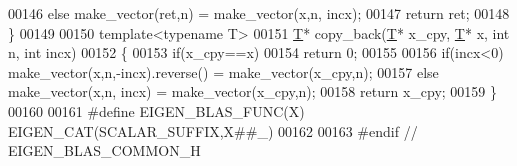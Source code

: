 \begin{DoxyCode}
00146   \textcolor{keywordflow}{else}       make\_vector(ret,n) = make\_vector(x,n, incx);
00147   \textcolor{keywordflow}{return} ret;
00148 \}
00149 
00150 \textcolor{keyword}{template}<\textcolor{keyword}{typename} T>
00151 \hyperlink{group___sparse_core___module}{T}* copy\_back(\hyperlink{group___sparse_core___module}{T}* x\_cpy, \hyperlink{group___sparse_core___module}{T}* x, \textcolor{keywordtype}{int} n, \textcolor{keywordtype}{int} incx)
00152 \{
00153   \textcolor{keywordflow}{if}(x\_cpy==x)
00154     \textcolor{keywordflow}{return} 0;
00155 
00156   \textcolor{keywordflow}{if}(incx<0) make\_vector(x,n,-incx).reverse() = make\_vector(x\_cpy,n);
00157   \textcolor{keywordflow}{else}       make\_vector(x,n, incx)           = make\_vector(x\_cpy,n);
00158   \textcolor{keywordflow}{return} x\_cpy;
00159 \}
00160 
00161 \textcolor{preprocessor}{#define EIGEN\_BLAS\_FUNC(X) EIGEN\_CAT(SCALAR\_SUFFIX,X##\_)}
00162 
00163 \textcolor{preprocessor}{#endif // EIGEN\_BLAS\_COMMON\_H}
\end{DoxyCode}
